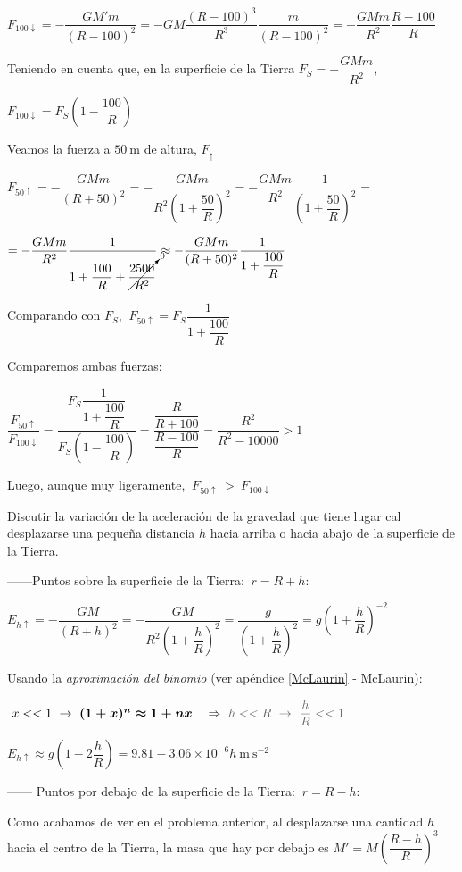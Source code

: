 $F_{100\downarrow}=-\dfrac{GM'm}{(R-100)^2}=-G M \dfrac{(R-100)^3}{R^3} \dfrac{m}{(R-100)^2}= -\dfrac{GMm}{R^2} \dfrac{R-100}{R}$

Teniendo en cuenta que, en la superficie de la Tierra $F_S= -\dfrac{GMm}{R^2}$,

$F_{100\downarrow}=F_S \left( 1 - \dfrac{100}{R} \right)$

Veamos la fuerza a $50 \ \mathrm{m}$ de altura, $F_{\uparrow}$

 $F_{50\uparrow} = -\dfrac {GMm}{(R+50)^2}=  -\dfrac {GMm}{R^2 \left( 1+\dfrac{50}{R} \right)^2}=-\dfrac {GMm}{R^2} \dfrac {1} {\left( 1+\dfrac{50}{R} \right)^2} =$ 
 
 $=-\dfrac {GMm}{R^2} \dfrac {1} {1+\dfrac {100}R + \cancelto{0}{\dfrac{2500}{R^2}}}\approx -\dfrac {GMm}{(R+50)^2} \dfrac 1 {1+\dfrac{100}{R}}$

Comparando con $F_S$, $\ F_{50\uparrow}=F_S \dfrac 1 {1+\dfrac{100}{R}}$

Comparemos ambas fuerzas: 

$\dfrac{F_{50\uparrow}}{F_{100\downarrow}}=\dfrac{F_S \dfrac 1 {1+\dfrac{100}{R}}}{F_S \left( 1 - \dfrac{100}{R} \right)} = \dfrac{\dfrac R{R+100}}{\dfrac{R-100}R}=\dfrac{R^2}{R^2-10000}>1$

Luego, aunque muy ligeramente, $\ F_{50\uparrow}\ > \ F_{100\downarrow}$

\begin{prob}
Discutir la variación de la aceleración de la gravedad que tiene lugar cal desplazarse	una pequeña distancia $h$ hacia arriba o hacia abajo de la superficie de la Tierra.
\end{prob}

 ------Puntos sobre la superficie de la Tierra: $ \ r=R+h :$
 
 $E_{h\uparrow}=-\dfrac{GM}{(R+h)^2}=-\dfrac{GM}{R^2\left(1+\dfrac h R \right)^2}= \dfrac{g}{\left(1+\dfrac h R \right)^2}=g\left(1+\dfrac h R \right)^{-2}$
 
 Usando la \emph{aproximación del binomio} (ver apéndice \ref{McLaurin} -  McLaurin): 
 
 $\ x<<1 \ \to \ \boldsymbol{ (1+x)^n\approx 1+nx } \quad \Rightarrow \ \textcolor{gris}{h<<R\ \to \ \dfrac h R << 1}$ 
 
 $E_{h\uparrow}\approx g \left( 1-2\dfrac{h}{R} \right)=9.81-3.06\times 10^{-6} h \ \mathrm{m\ s}^{-2}$

------ Puntos por debajo de la superficie de la Tierra: $\ r=R-h : $

Como acabamos de ver en el problema anterior, al desplazarse una cantidad $h$ hacia el centro de la Tierra, la masa que hay por debajo es $M'=M{\left( \dfrac{R-h}R \right) }^3$

